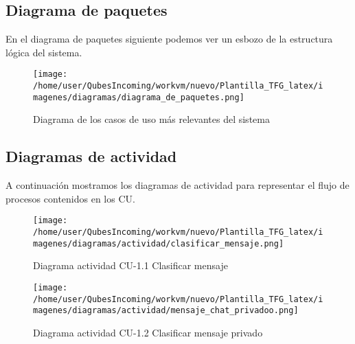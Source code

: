     \clearpage
    \subsection{Diagrama de paquetes}

   En el diagrama de paquetes siguiente podemos ver un esbozo de la estructura lógica del sistema.
      
    
    \begin{figure}[H] %
\centering
\texttt{[image: /home/user/QubesIncoming/workvm/nuevo/Plantilla\_TFG\_latex/imagenes/diagramas/diagrama\_de\_paquetes.png]}  %

\caption{Diagrama de los casos de uso más relevantes del sistema}\label{figura20}
\end{figure}

    
    
    \newpage
    
   \subsection{Diagramas de actividad}

A continuación mostramos los diagramas de actividad para representar el flujo de procesos contenidos en los CU.

    \begin{figure}[H] %
\centering
\texttt{[image: /home/user/QubesIncoming/workvm/nuevo/Plantilla\_TFG\_latex/imagenes/diagramas/actividad/clasificar\_mensaje.png]}  %

\caption{Diagrama actividad CU-1.1 Clasificar mensaje}\label{figura111}
\end{figure}

    \begin{figure}[H] %
\centering
\texttt{[image: /home/user/QubesIncoming/workvm/nuevo/Plantilla\_TFG\_latex/imagenes/diagramas/actividad/mensaje\_chat\_privadoo.png]}  %

\caption{Diagrama actividad CU-1.2 Clasificar mensaje privado}\label{figura131}
\end{figure}
    

